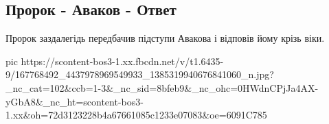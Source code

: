  
 
 
 
 

\subsection{Пророк - Аваков - Ответ}

Пророк заздалегідь передбачив підступи Авакова і відповів йому крізь віки.

\ifcmt
  pic https://scontent-bos3-1.xx.fbcdn.net/v/t1.6435-9/167768492_4437978969549933_1385319940676841060_n.jpg?_nc_cat=102&ccb=1-3&_nc_sid=8bfeb9&_nc_ohc=0HWdnCPjJa4AX-yGbA8&_nc_ht=scontent-bos3-1.xx&oh=72d3123228b4a67661085c1233e07083&oe=6091C785
\fi

